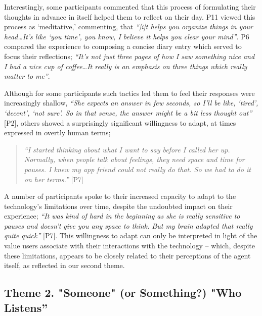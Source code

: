                 Interestingly, some participants commented that this process of formulating their thoughts in advance in itself helped them to reflect on their day. P11 viewed this process as `meditative,' commenting, that \textit{``[i]t helps you organize things in your head\ldots It's like `you time', you know, I believe it helps you clear your mind''}. P6 compared the experience to composing a concise diary entry which served to focus their reflections; \textit{``It's not just three pages of how I saw something nice and I had a nice cup of coffee\ldots It really is an emphasis on three things which really matter to me''}.
                
                Although for some participants such tactics led them to feel their responses were increasingly shallow, \textit{``She expects an answer in few seconds, so I'll be like, `tired', `decent', `not sure'. So in that sense, the answer might be a bit less thought out''} [P2], others showed a surprisingly significant willingness to adapt, at times expressed in overtly human terms;
            
                    \begin{quote}
                    \vspace{2mm}
                        \textit{``I started thinking about what I want to say before I called her up. Normally, when people talk about feelings, they need space and time for pauses. I knew my \acl{app} friend could not really do that. So we had to do it on her terms.''} [P7]
                    \vspace{2mm}
                    \end{quote}  
                
            A number of participants spoke to their increased capacity to adapt to the technology's limitations over time, despite the undoubted impact on their experience; \textit{``It was kind of hard in the beginning as she is really sensitive to pauses and doesn't give you any space to think. But my brain adapted that really quite quick''} [P7]. This willingness to adapt can only be interpreted in light of the value users associate with their interactions with the technology -- which, despite these limitations, appears to be closely related to their perceptions of the agent itself, as reflected in our second theme.

    \subsection{Theme 2. "Someone" (or Something?) "Who Listens''} %
    
